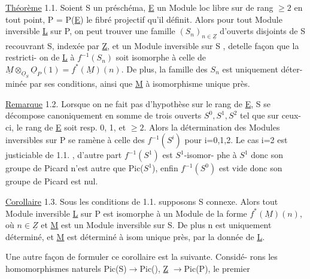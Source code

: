 \uline{Théorème} 1.1. Soient S un préschéma, \underline{E} un Module loc libre sur  de
rang  $\geqslant 2$ en tout point,
 P = P(\underline{E}) le fibré projectif qu'il définit. Alors
 pour tout Module inversible \underline{L} sur P, on peut trouver une famille
 $(S_n)_{n\in\underline{Z}}$ d'ouverts disjoints de S recouvrant S, indexée par \underline{Z}, et
 un Module inversible  sur S , detelle façon que
 la restricti-%
on de \underline{L} à $f^{-1}(S_n)$ soit isomorphe à celle de $\underline{M}\otimes_{\underline{O}_S}\underline{O}_P(1) = f^*(\underline{M})(n)$.
De plus, la  famille des $S_n$  est uniquement déter-%
minée par ses conditions, ainsi que \underline{M} à isomorphisme unique près.

\uline{Remarque} 1.2. Lorsque on ne fait pas d'hypothèse sur le rang de \underline{E}, S se
décompose canoniquement en somme de trois ouverts $S^0,S^1,S^2$ tel que sur
ceux-ci, le rang de \underline{E} soit resp. 0, 1, et $\geqslant 2$. Alors la détermination des
Modules inversibles sur P se ramène à celle des $f^{-1}(S^{i})$ pour i=0,1,2.
Le cas i=2 est justiciable de 1.1. , d'autre part $f^{-1}(S^1)$ est $S^1$-isomor-%
phe à $S^1$ donc son groupe de Picard n'est autre que Pic($S^1$), enfin
$f^{-1}(S^0)$ est vide donc son groupe de Picard est nul.

\uline{Corollaire} 1.3. Sous les conditions de 1.1. supposons S connexe. Alors
tout Module inversible \underline{L} sur P est isomorphe à un Module de la forme
$f^*(\underline{M})(n)$, où $n\in\underline{Z}$ et \underline{M} est un Module inversible sur S. De plus n est
uniquement déterminé, et \underline{M} est déterminé à isom unique près, par la donnée
de \underline{L}.

Une autre façon de formuler ce corollaire est la suivante. Considé-%
rons les homomorphismes naturels Pic(S)$\longrightarrow$Pic(), \underline{Z} $\longrightarrow$Pic(P), le premier
